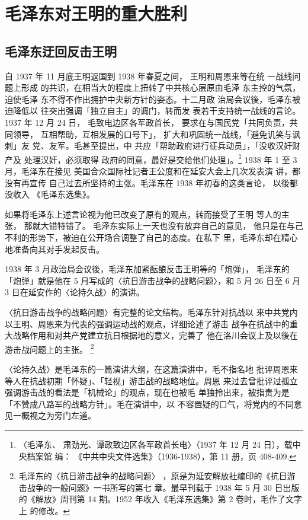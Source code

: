 \chapter{毛泽东对王明的重大胜利} 
\section{毛泽东迂回反击王明}

自 1937 年
11 月底王明返国到 1938 年春夏之间， 王明和周恩来等在统 一战线问题上形成
的共识，在相当大的程度上扭转了中共核心层原由毛泽 东主控的气氛，迫使毛泽
东不得不作出拥护中央新方针的姿态。十二月政 治局会议後，毛泽东被迫降低以
往突出强调「独立自主」的调门，转而发 表若干支持统一战线的言论。1937 年
12 月 24 日， 毛致电边区各军政首长， 要求在与国民党「共同负责，共同领导，
互相帮助，互相发展的口号下」， 扩大和巩固统一战线，「避免讥笑与讽刺」友
党、友军。毛甚至提出，中 共应「帮助政府进行征兵动员」，「没收汉奸财产及
处理汉奸，必须取得 政府的同意，最好是交给他们处理」。\footnote{〈毛泽东、
肃劲光、谭政致边区各军政首长电〉（1937 年 12 月 24 日），载中央档案馆
编： 《中共中央文件选集》（1936-1938），第 11 册，页 408-409.} 1938 年
1 至 3 月，毛泽东在接见 美国合众国际社记者王公度和在延安大会上几次发表演
讲，都没有再宣传 自己过去所坚持的主张。毛泽东在 1938 年初春的这类言论，
以後都没收入 《毛泽东选集》。
 
如果将毛泽东上述言论视为他已改变了原有的观点，转而接受了王明
等人的主张，
那就大错特错了。
毛泽东实际上一天也没有放弃自己的意见，
他只是在与己不利的形势下，被迫在公开场合调整了自己的态度。在私下
里，毛泽东却在精心地准备向其对手发起反击。

1938 年 3 月政治局会议後，毛泽东加紧酝酿反击王明等的「炮弹」，
毛泽东的「炮弹」就是他在 5 月写成的〈抗日游击战争的战略问题〉，和
5 月 26 日至 6 月 3 日在延安作的〈论持久战〉的演讲。

〈抗日游击战争的战略问题〉有完整的论文结构。毛泽东针对抗战以
来中共党内以王明、周恩来为代表的强调运动战的观点，详细论述了游击
战争在抗战中的重大战略作用和对共产党建立抗日根据地的意义，完善了
他在洛川会议上及以後在游击战问题上的主张。
\footnote{毛泽东的〈抗日游击战争的战略问题〉
，原是为延安解放社编印的《抗日游击战争的一般问题》一书所写的第七
章。最早刊载于 1938 年 5 月 30 日出版的《解放》周刊第 14 期。1952 年收入《毛泽东选集》第 2 卷时，毛作了文字上
的修改。}

〈论持久战〉是毛泽东的一篇演讲大纲，在这篇演讲中，毛不指名地
批评周恩来等人在抗战初期「怀疑」、「轻视」游击战的战略地位。周恩
来过去曾批评过孤立强调游击战的看法是「机械论」的观点，现在也被毛
单独拎出来，被指责为是「不赞成八路军的战略方针」。毛在演讲中，以
不容置疑的口气，将党内的不同意见一概视之为旁门左道。


